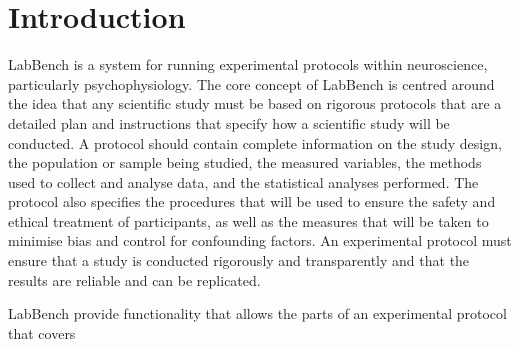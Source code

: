\chapter{Introduction}

LabBench is a system for running experimental protocols within neuroscience, particularly psychophysiology. The core concept of LabBench is centred around the idea that any scientific study must be based on rigorous protocols that are a detailed plan and instructions that specify how a scientific study will be conducted. A protocol should contain complete information on the study design, the population or sample being studied, the measured variables, the methods used to collect and analyse data, and the statistical analyses performed. The protocol also specifies the procedures that will be used to ensure the safety and ethical treatment of participants, as well as the measures that will be taken to minimise bias and control for confounding factors. An experimental protocol must ensure that a study is conducted rigorously and transparently and that the results are reliable and can be replicated.

LabBench provide functionality that allows the parts of an experimental protocol that covers 